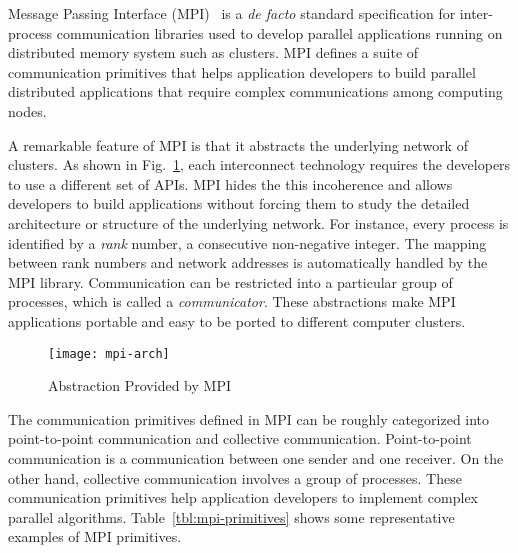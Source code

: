 Message Passing Interface (MPI)~\autocite{MPIForum2012} is a \emph{de
facto} standard specification for inter-process communication libraries
used to develop parallel applications running on distributed memory system
such as clusters. MPI defines a suite of communication primitives that helps
application developers to build parallel distributed applications that require
complex communications among computing nodes.

A remarkable feature of MPI is that it abstracts the underlying network
of clusters. As shown in Fig.~\ref{fig:mpi-arch}, each interconnect technology
requires the developers to use a different set of APIs. MPI hides the this
incoherence and allows developers to build applications without forcing them
to study the detailed architecture or structure of the underlying network. For
instance, every process is identified by a \emph{rank} number, a consecutive
non-negative integer. The mapping between rank numbers and network addresses
is automatically handled by the MPI library. Communication can be restricted
into a particular group of processes, which is called a \emph{communicator}.
These abstractions make MPI applications portable and easy to be ported to
different computer clusters.

\begin{figure}
    \centering
    \texttt{[image: mpi-arch]}
    \caption{Abstraction Provided by MPI}%
    \label{fig:mpi-arch}
\end{figure}

The communication primitives defined in MPI can be roughly categorized into
point-to-point communication and collective communication. Point-to-point
communication is a communication between one sender and one receiver. On the
other hand, collective communication involves a group of processes. These
communication primitives help application developers to implement complex
parallel algorithms. Table~\ref{tbl:mpi-primitives} shows some representative
examples of MPI primitives.

